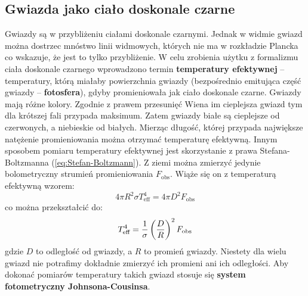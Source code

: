 \documentclass[../index.tex]{subfiles}
\begin{document}
        \subsection{Gwiazda jako ciało doskonale czarne}
            Gwiazdy są w przybliżeniu ciałami doskonale czarnymi. Jednak w widmie gwiazd można dostrzec mnóstwo linii widmowych, których nie ma w rozkładzie Plancka co wskazuje, że jest to tylko przybliżenie. W celu zrobienia użytku z formalizmu ciała doskonale czarnego wprowadzono termin \textbf{temperatury efektywnej} \--- temperatury, którą miałaby powierzchnia gwiazdy (bezpośrednio emitująca część gwiazdy \--- \textbf{fotosfera}), gdyby promieniowała jak ciało doskonale czarne.
            Gwiazdy mają różne kolory. Zgodnie z prawem przesunięć Wiena im cieplejsza gwiazd tym dla krótszej fali przypada maksimum. Zatem gwiazdy białe są cieplejsze od czerwonych, a niebieskie od białych. Mierząc długość, której przypada największe natężenie promieniowania można otrzymać temperaturę efektywną. Innym sposobem pomiaru temperatury efektywnej jest skorzystanie z prawa Stefana-Boltzmanna (\ref{eq:Stefan-Boltzmann}). Z ziemi można zmierzyć jedynie bolometryczny strumień promieniowania \(F_\text{obs}\). Wiąże się on z temperaturą efektywną wzorem:
            \begin{equation}
                4\pi R^2 \sigma T_\text{eff}^{4} = 4\pi D^2 F_\text{obs} 
            \end{equation}
            co można przekształcić do:
            \begin{equation}
                T_\text{eff}^{4} = \frac{1}{\sigma}\left(\frac{D}{R}\right)^2 F_\text{obs}
            \end{equation}
            gdzie \(D\) to odległość od gwiazdy, a \(R\) to promień gwiazdy. Niestety dla wielu gwiazd nie potrafimy dokładnie zmierzyć ich promieni ani ich odległości. Aby dokonać pomiarów temperatury takich gwiazd stosuje się \textbf{system fotometryczny Johnsona-Cousinsa}.
\end{document}
